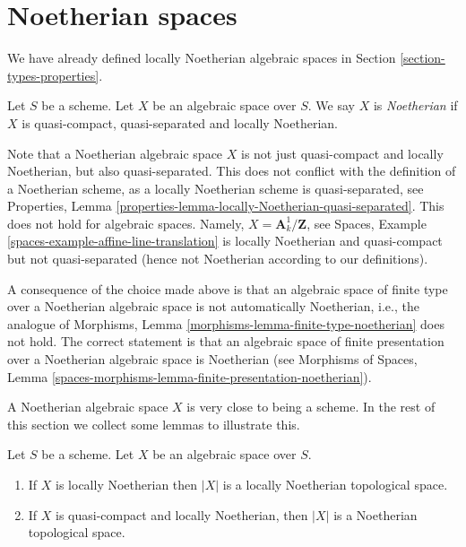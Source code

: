 \section{Noetherian spaces}
\label{section-noetherian}

\noindent
We have already defined locally Noetherian algebraic spaces in
Section \ref{section-types-properties}.

\begin{definition}
\label{definition-noetherian}
Let $S$ be a scheme. Let $X$ be an algebraic space over $S$.
We say $X$ is {\it Noetherian} if $X$ is quasi-compact, quasi-separated
and locally Noetherian.
\end{definition}

\noindent
Note that a Noetherian algebraic space $X$ is not just quasi-compact
and locally Noetherian, but also quasi-separated. This does not conflict
with the definition of a Noetherian scheme, as a locally Noetherian
scheme is quasi-separated, see
Properties, Lemma \ref{properties-lemma-locally-Noetherian-quasi-separated}.
This does not hold for algebraic spaces. Namely,
$X = \mathbf{A}^1_k/\mathbf{Z}$, see
Spaces, Example \ref{spaces-example-affine-line-translation}
is locally Noetherian and quasi-compact but not quasi-separated
(hence not Noetherian according to our definitions).

\medskip\noindent
A consequence of the choice made above is that an algebraic space
of finite type over a Noetherian algebraic space is not automatically
Noetherian, i.e., the analogue of
Morphisms, Lemma \ref{morphisms-lemma-finite-type-noetherian}
does not hold. The correct statement is that an algebraic space of
finite presentation over a Noetherian algebraic space is Noetherian
(see
Morphisms of Spaces,
Lemma \ref{spaces-morphisms-lemma-finite-presentation-noetherian}).

\medskip\noindent
A Noetherian algebraic space $X$ is very close to being a scheme.
In the rest of this section we collect some lemmas to illustrate this.

\begin{lemma}
\label{lemma-Noetherian-topology}
Let $S$ be a scheme. Let $X$ be an algebraic space over $S$.
\begin{enumerate}
\item If $X$ is locally Noetherian then $|X|$ is a locally Noetherian
topological space.
\item If $X$ is quasi-compact and locally Noetherian, then $|X|$
is a Noetherian topological space.
\end{enumerate}
\end{lemma}

